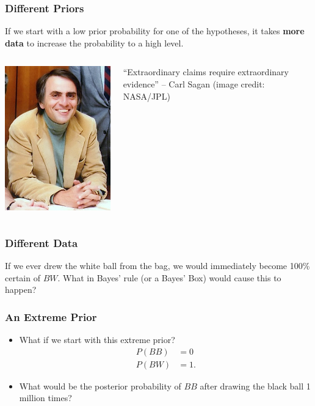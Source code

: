\documentclass{beamer}
\begin{document}
\begin{frame}
\frametitle{Different Priors}
If we start with a low prior probability for one of the hypotheses, it takes
{\bf more data} to increase the probability to a high level.



    \begin{columns} %
        \hspace{2em}
        \includegraphics[width=0.6\linewidth]{images/sagan.jpg}

        ``Extraordinary claims require extraordinary evidence'' --
        Carl Sagan (image credit: NASA/JPL)
     \end{columns}


\end{frame}

\begin{frame}
\frametitle{Different Data}
If we ever drew the white ball from the bag, we would immediately become
100\% certain of $BW$. What in Bayes' rule (or a Bayes' Box) would cause this
to happen?

\end{frame}


\begin{frame}
\frametitle{An Extreme Prior}
\begin{itemize}
\item What if we start with this extreme prior?
\begin{align}
P(BB) &= 0 \\
P(BW) &= 1.
\end{align}

\item What would be the posterior probability of $BB$ after drawing the black
ball 1 million times?

\end{itemize}

\end{frame}
\end{document}
